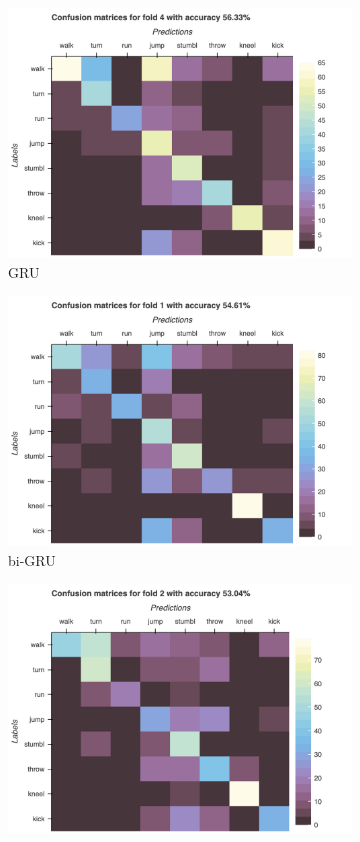\begin{figure}[H]
\begin{subfigure}[b]{0.49\textwidth}
				\includegraphics[width=\textwidth]{img/GRU-confusion_matrix.png}
				\caption{GRU}
			\end{subfigure}
			\hfill
			\begin{subfigure}[b]{0.49\textwidth}
				\centering
				\includegraphics[width=\textwidth]{img/bi-GRU-confusion_matrix.png}
				\caption{bi-GRU}
			\end{subfigure}
			\hfill
			\begin{subfigure}[b]{0.49\textwidth}
				\centering
				\includegraphics[width=\textwidth]{img/LSTM-confusion_matrix.png}

\end{subfigure}
\end{figure}
